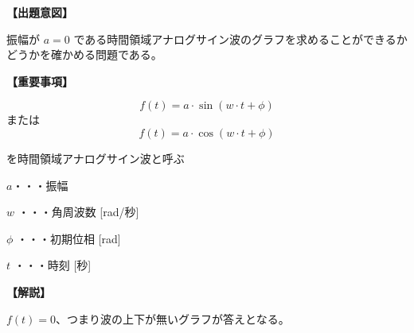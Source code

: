 \noindent \textbf{【出題意図】}

\noindent 振幅が $a = 0$ である時間領域アナログサイン波のグラフを求めることができるかどうかを確かめる問題である。

\vspace{1em}
\noindent \textbf{【重要事項】}

\fleqnoff
\[
f(t) = a \cdot \sin( w \cdot t + \phi )
\]
\fleqnon
%
\noindent または
%
\fleqnoff
\[
f(t) = a \cdot \cos( w \cdot t + \phi )
\]
\fleqnon

\medskip
\noindent を時間領域アナログサイン波と呼ぶ

\bigskip
\noindent $a$・・・振幅

\bigskip
\noindent $w$ ・・・角周波数 [rad/秒]

\bigskip
\noindent $\phi$ ・・・初期位相 [rad]

\bigskip
\noindent $t$ ・・・時刻 [秒]

\vspace{1em}
\noindent \textbf{【解説】}

\noindent $f(t) = 0$、つまり波の上下が無いグラフが答えとなる。

